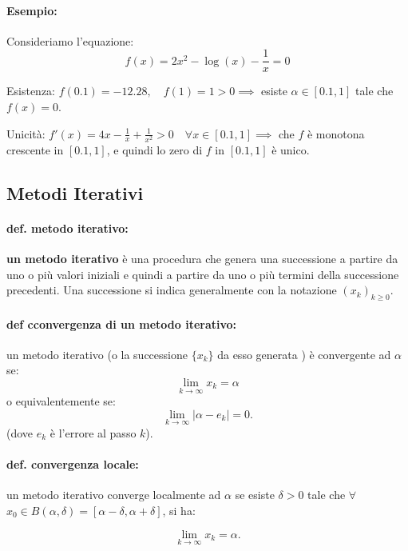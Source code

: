 \documentclass[a4paper, 11pt]{article}
\begin{document}
        \paragraph{Esempio:}
        Consideriamo l'equazione:
        \[
        f(x) = 2x^2 - \log(x) - \frac{1}{x} = 0
        \]

        Esistenza: $f(0.1) = -12.28, \quad f(1) = 1 > 0 \implies$ esiste \( \alpha \in [0.1, 1] \) tale che \( f(x) = 0 \).

        Unicità: $f'(x) = 4x - \frac{1}{x} + \frac{1}{x^2} > 0 \quad \forall x \in [0.1, 1] \implies$ che \( f \) è monotona crescente in \([0.1, 1]\), e quindi lo zero di \( f \) in \([0.1, 1]\) è unico.



        \subsection{Metodi Iterativi}
        \paragraph{def. metodo iterativo:} \textbf{un metodo iterativo} è una procedura che genera una successione a partire da uno o più valori iniziali e quindi a partire da uno o più termini della successione precedenti. Una successione si indica generalmente con la notazione \( (x_k)_{k \geq 0} \).

        \paragraph{def cconvergenza di un metodo iterativo:} un metodo iterativo (o la successione  \( \{x_k\} \) da esso generata ) è convergente ad \( \alpha \) se:
        \[
        \lim_{k \to \infty} x_k = \alpha
        \]
        o equivalentemente se:
        \[
        \lim_{k \to \infty} | \alpha - e_k | = 0.
        \]
        (dove \( e_k \) è l'errore al passo \( k \)).

        \paragraph{def. convergenza locale:} un metodo iterativo converge localmente ad \( \alpha \) se esiste \( \delta > 0 \) tale che $ \forall  $ \( x_0 \in B(\alpha, \delta) = [\alpha - \delta, \alpha + \delta] \), si ha:

        \[
            \lim_{k \to \infty} x_k = \alpha.
        \]
\end{document}
